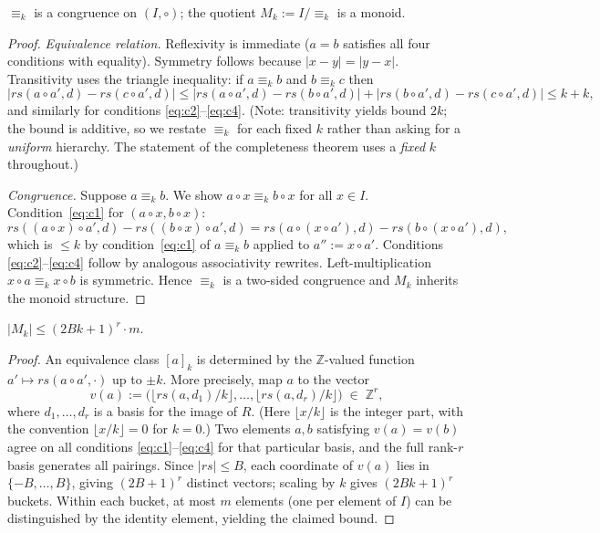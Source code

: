 \begin{lemma}[Congruence]
\label{lem:congr}
$\equiv_k$ is a congruence on $(I,{\circ})$; the quotient
$M_k := I/{\equiv_k}$ is a monoid.
\end{lemma}

\begin{proof}
\emph{Equivalence relation.}
Reflexivity is immediate ($a=b$ satisfies all four conditions with
equality).  Symmetry follows because $|x-y|=|y-x|$.  Transitivity
uses the triangle inequality: if $a\equiv_k b$ and $b\equiv_k c$
then
\[
  |\mathit{rs}(a{\circ}a',d)-\mathit{rs}(c{\circ}a',d)| \le
  |\mathit{rs}(a{\circ}a',d)-\mathit{rs}(b{\circ}a',d)| +
  |\mathit{rs}(b{\circ}a',d)-\mathit{rs}(c{\circ}a',d)|
  \le k+k,
\]
and similarly for conditions \eqref{eq:c2}--\eqref{eq:c4}.
(Note: transitivity yields bound $2k$; the bound is additive, so we
restate $\equiv_k$ for each fixed $k$ rather than asking for a
\emph{uniform} hierarchy.  The statement of the completeness theorem
uses a \emph{fixed} $k$ throughout.)

\emph{Congruence.}  Suppose $a\equiv_k b$.  We show
$a{\circ}x \equiv_k b{\circ}x$ for all $x\in I$.
Condition~\eqref{eq:c1} for $(a{\circ}x, b{\circ}x)$:
\[
  \mathit{rs}((a{\circ}x){\circ}a',d)
  - \mathit{rs}((b{\circ}x){\circ}a',d)
  = \mathit{rs}(a{\circ}(x{\circ}a'),d)
  - \mathit{rs}(b{\circ}(x{\circ}a'),d),
\]
which is $\le k$ by condition~\eqref{eq:c1} of $a\equiv_k b$ applied
to $a'' := x{\circ}a'$.  Conditions \eqref{eq:c2}--\eqref{eq:c4}
follow by analogous associativity rewrites.  Left-multiplication
$x{\circ}a \equiv_k x{\circ}b$ is symmetric.  Hence $\equiv_k$ is
a two-sided congruence and $M_k$ inherits the monoid structure.
\end{proof}

\begin{theorem}
\label{thm:finite}
$|M_k| \le (2Bk+1)^r \cdot m$.
\end{theorem}

\begin{proof}
An equivalence class $[a]_k$ is determined by the $\mathbb{Z}$-valued
function $a' \mapsto \mathit{rs}(a{\circ}a',\cdot)$ up to $\pm k$.
More precisely, map $a$ to the vector
\[
  v(a) := \bigl(\lfloor \mathit{rs}(a,d_1)/k \rfloor,
                \ldots,
                \lfloor \mathit{rs}(a,d_r)/k \rfloor\bigr)
         \;\in\; \mathbb{Z}^r,
\]
where $d_1,\ldots,d_r$ is a basis for the image of $R$.
(Here $\lfloor x/k\rfloor$ is the integer part, with the convention
$\lfloor x/k\rfloor = 0$ for $k=0$.)
Two elements $a,b$ satisfying $v(a)=v(b)$ agree on all
conditions \eqref{eq:c1}--\eqref{eq:c4} for that particular basis,
and the full rank-$r$ basis generates all pairings.  Since
$|\mathit{rs}|\le B$, each coordinate of $v(a)$ lies in
$\{-B,\ldots,B\}$, giving $(2B+1)^r$ distinct vectors; scaling by $k$
gives $(2Bk+1)^r$ buckets.  Within each bucket, at most $m$ elements
(one per element of $I$) can be distinguished by the identity
element, yielding the claimed bound.
\end{proof}

